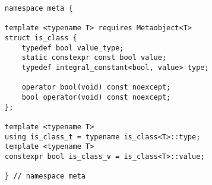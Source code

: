 
\begin{verbatim}
namespace meta {

template <typename T> requires Metaobject<T>
struct is_class {
	typedef bool value_type;
	static constexpr const bool value;
	typedef integral_constant<bool, value> type;

	operator bool(void) const noexcept;
	bool operator(void) const noexcept;
};

template <typename T>
using is_class_t = typename is_class<T>::type;
template <typename T>
constexpr bool is_class_v = is_class<T>::value;

} // namespace meta
\end{verbatim}
